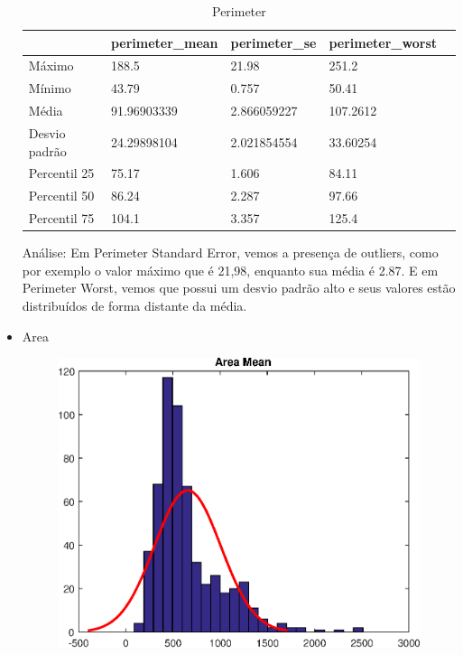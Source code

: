 \documentclass[11pt,a4paper]{article}
\numberwithin{equation}{section}
\begin{document}
\begin{itemize}
\begin{table}[H]
\centering
\caption{Perimeter}
\label{my-label}
\begin{tabular}{lllll} \hline
              & perimeter\_mean & perimeter\_se & perimeter\_worst &  \\ \hline
Máximo        & 188.5           & 21.98         & 251.2            &  \\
Mínimo        & 43.79           & 0.757         & 50.41            &  \\
Média         & 91.96903339     & 2.866059227   & 107.2612         &  \\
Desvio padrão & 24.29898104     & 2.021854554   & 33.60254         &  \\
Percentil 25  & 75.17           & 1.606         & 84.11            &  \\
Percentil 50  & 86.24           & 2.287         & 97.66            &  \\
Percentil 75  & 104.1           & 3.357         & 125.4            & \\ \hline
\end{tabular}
\end{table}

Análise: Em Perimeter Standard Error, vemos a presença de outliers, como por exemplo o valor máximo que é 21,98,  enquanto sua média é 2.87. E em Perimeter Worst, vemos que possui um desvio padrão alto e seus valores estão distribuídos de forma distante da média.


\item Area
\begin{figure}[H]
\centering
  \includegraphics[width=.4\linewidth]{./img/area_mean}
  \label{fig:test1}
\end{figure}%


\end{itemize}
\end{document}
